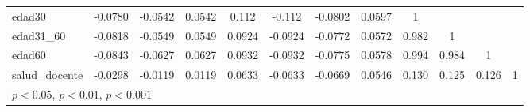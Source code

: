 {\begin{tabular}{l*{11}{c}}
edad30    &  -0.0780\sym{***}&  -0.0542\sym{***}&   0.0542\sym{***}&    0.112\sym{***}&   -0.112\sym{***}&  -0.0802\sym{***}&   0.0597\sym{***}&        1         &                  &                  &                  \\
edad31\_60 &  -0.0818\sym{***}&  -0.0549\sym{***}&   0.0549\sym{***}&   0.0924\sym{***}&  -0.0924\sym{***}&  -0.0772\sym{***}&   0.0572\sym{***}&    0.982\sym{***}&        1         &                  &                  \\
edad60    &  -0.0843\sym{***}&  -0.0627\sym{***}&   0.0627\sym{***}&   0.0932\sym{***}&  -0.0932\sym{***}&  -0.0775\sym{***}&   0.0578\sym{***}&    0.994\sym{***}&    0.984\sym{***}&        1         &                  \\
salud\_docente&  -0.0298\sym{***}&  -0.0119\sym{*}  &   0.0119\sym{*}  &   0.0633\sym{***}&  -0.0633\sym{***}&  -0.0669\sym{***}&   0.0546\sym{***}&    0.130\sym{***}&    0.125\sym{***}&    0.126\sym{***}&        1         \\
\hline\hline
\multicolumn{12}{l}{\footnotesize \sym{*} \(p<0.05\), \sym{**} \(p<0.01\), \sym{***} \(p<0.001\)}\\
\end{tabular}
}
